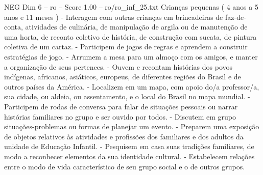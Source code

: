 \begin{textsample}{NEG Dim 6 – ro – Score 1.00 – ro/ro\_inf\_25.txt}  \label{ex:f6_neg_156}
Crianças pequenas ( 4 anos a 5 anos e 11 meses ) - Interagem com outras crianças em brincadeiras de faz-de-conta, atividades de culinária, de manipulação de argila ou de manutenção de uma horta, de reconto coletivo de história, de construção com sucata, de pintura coletiva de um cartaz. - Participem de jogos de regras e aprendem a construir estratégias de jogo. - Arrumem a mesa para um almoço com os amigos, e manter a organização de seus pertences. - Ouvem e recontam histórias dos povos indígenas, africanos, asiáticos, europeus, de diferentes regiões do Brasil e de outros países da América. - Localizem em um mapa, com apoio do/a professor/a, sua cidade, ou aldeia, ou assentamento, e o local do Brasil no mapa mundial. - Participem de rodas de conversa para falar de situações pessoais ou narrar histórias familiares no grupo e ser ouvido por todos. - Discutem em grupo situações-problemas ou formas de planejar um evento. - Preparem uma exposição de objetos relativos às atividades e profissões dos familiares e dos adultos da unidade de Educação Infantil. - Pesquisem em casa suas tradições familiares, de modo a reconhecer elementos da sua identidade cultural. - Estabelecem relações entre o modo de vida característico de seu grupo social e o de outros grupos.

\end{textsample}

